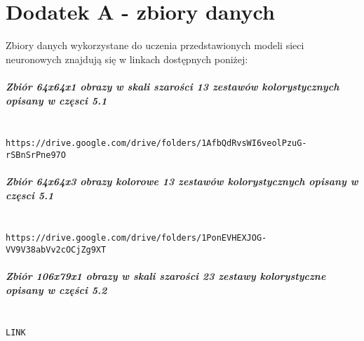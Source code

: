 
\chapter{Dodatek A - zbiory danych}
Zbiory danych wykorzystane do uczenia przedstawionych modeli sieci neuronowych
znajdują się w linkach dostępnych poniżej:

\paragraph{Zbiór 64x64x1 obrazy w skali szarości 13 zestawów kolorystycznych opisany w częsci 5.1} \mbox{}\\
\texttt{https://drive.google.com/drive/folders/1AfbQdRvsWI6veolPzuG-rSBnSrPne97O}

\paragraph{Zbiór 64x64x3 obrazy kolorowe 13 zestawów kolorystycznych opisany w częsci 5.1} \mbox{}\\
\texttt{https://drive.google.com/drive/folders/1PonEVHEXJOG-VV9V38abVv2cOCjZg9XT}

\paragraph{Zbiór 106x79x1 obrazy w skali szarości 23 zestawy kolorystyczne opisany w części 5.2} \mbox{}\\
\texttt{LINK}
